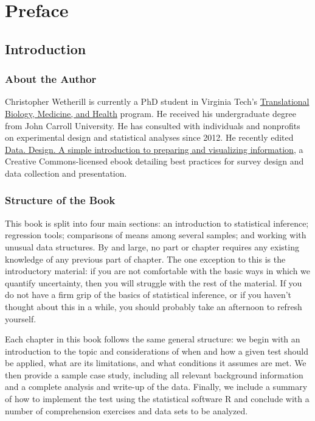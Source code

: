 
\chapter{Preface}
\section{Introduction}
\subsection{About the Author}
Christopher Wetherill is currently a PhD student in Virginia Tech's \href{http://www.tbmh.vt.edu/}{Translational Biology, Medicine, and Health} program. He received his undergraduate degree from John Carroll University. He has consulted with individuals and nonprofits on experimental design and statistical analyses since 2012. He recently edited \href{https://infoactive.co/ebook}{Data. Design. A simple introduction to preparing and visualizing information}, a Creative Commons-licensed ebook detailing best practices for survey design and data collection and presentation.

\subsection{Structure of the Book}
This book is split into four main sections: an introduction to statistical inference; regression tools; comparisons of means among several samples; and working with unusual data structures. By and large, no part or chapter requires any existing knowledge of any previous part of chapter. The one exception to this is the introductory material: if you are not comfortable with the basic ways in which we quantify uncertainty, then you will struggle with the rest of the material. If you do not have a firm grip of the basics of statistical inference, or if you haven't thought about this in a while, you should probably take an afternoon to refresh yourself.

Each chapter in this book follows the same general structure: we begin with an introduction to the topic and considerations of when and how a given test should be applied, what are its limitations, and what conditions it assumes are met. We then provide a sample case study, including all relevant background information and a complete analysis and write-up of the data. Finally, we include a summary of how to implement the test using the statistical software R and conclude with a number of comprehension exercises and data sets to be analyzed.

